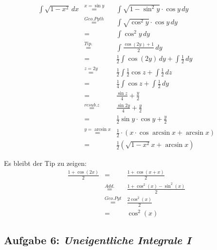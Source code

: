 \documentclass[11pt,a4paper,ngerman]{article}
\begin{document}
\begin{enumerate}[(i)]
		$$\begin{array}{rcl}
            \int \sqrt{1-x^2} \, dx &\stackrel{x=\sin y}{=}&
                \int \sqrt{1- \sin^2 y} \cdot \cos y \, dy\\
            &\stackrel{Geo. Pyth}{=}& \int \sqrt{\cos^2 y} \cdot \cos y \, dy\\
            &=& \int \cos^2 y \, dy\\
            &\stackrel{Tip.}{=}& \int \frac{\cos (2 y) + 1}{2} \, dy\\
            &=& \frac{1}{2} \int \cos (2y) \, dy + \int \frac{1}{2} \, dy\\
            &\stackrel{z=2y}{=}&
                \frac{1}{2} \int \frac{1}{2} \cos z + \int \frac{1}{2} \, dz\\
            &=& \frac{1}{4} \int \cos z + \int \frac{1}{2} \, dy\\
            &=& \frac{\sin z}{4} + \frac{y}{2}\\
            &\stackrel{resub. z}{=}&
                \frac{\sin 2y}{4} + \frac{y}{2}\\
            &=&
                \frac{1}{2} \sin y \cdot \cos y + \frac{y}{2}\\
            &\stackrel{y=\arcsin x}{=}&
                \frac{1}{2} \cdot \left( x \cdot \cos \arcsin x 
                    + \arcsin x\right)\\
            &=& \frac{1}{2} \left( \sqrt{1-x^2}x + \arcsin{x} \right)
        \end{array}$$

        Es bleibt der Tip zu zeigen:\\
        $$\begin{array}{rcl}
            \frac{1+\cos (2x)}{2} &=& \frac{1+\cos (x+x)}{2}\\
                &\stackrel{Add.}{=}& \frac{1+\cos^2 (x) - \sin^2 (x)}{2}\\
                &\stackrel{Geo.Pyt}{=}& \frac{2 \cos^2 (x)}{2}\\
                &=& \cos^2 (x)
        \end{array}$$
\end{enumerate}


\pagebreak

\subsection*{Aufgabe 6: \mdseries\itshape Uneigentliche Integrale I}
\end{document}
